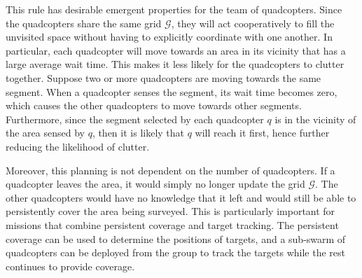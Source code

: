 \documentclass[letterpaper, 10pt, conference]{ieeeconf}
\newcommand{\Symbol}[1]{\ensuremath{\mathcal{#1}}}
\begin{document}
This rule has desirable emergent properties for the team of 
quadcopters.  Since the quadcopters share the same grid $\Symbol{G}$,
they will act cooperatively to fill the unvisited space without having
to explicitly coordinate with one another. In particular, each
quadcopter will move towards an area in its vicinity that has a large
average wait time.  This makes it less likely for the quadcopters to
clutter together. Suppose two or more quadcopters are moving towards
the same segment. When a quadcopter senses the segment, its wait time
becomes zero, which causes the other quadcopters to move towards other
segments. Furthermore, since the segment selected by each quadcopter
$q$ is in the vicinity of the area sensed by $q$, then it
is likely that $q$ will reach it first, hence further reducing the
likelihood of clutter.

Moreover, this planning is not dependent on the
number of quadcopters.  If a quadcopter leaves the area, it would
simply no longer update the grid $\Symbol{G}$. The other quadcopters
would have no knowledge that it left and would still be able to
persistently cover the area being surveyed.
This is particularly important for missions
that combine persistent coverage and target tracking. The
persistent coverage can be used to determine the positions
of targets, and a sub-swarm of quadcopters can be deployed
from the group to track the targets while the rest 
continues to provide coverage.
\end{document}
